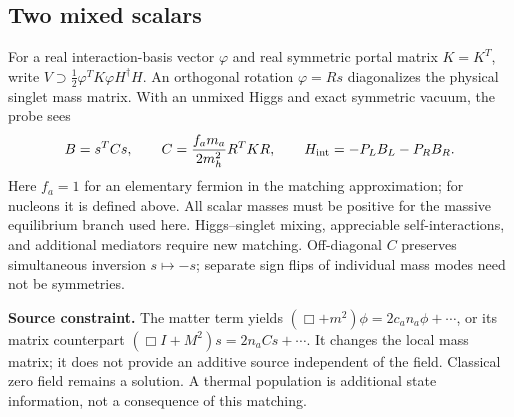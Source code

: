 \documentclass[11pt]{article}
\begin{document}
\subsection*{Two mixed scalars}
For a real interaction-basis vector $\varphi$ and real symmetric portal
matrix $K=K^T$, write $V\supset\tfrac12\varphi^TK\varphi H^\dagger H$.
An orthogonal rotation $\varphi=Rs$ diagonalizes the physical singlet
mass matrix. With an unmixed Higgs and exact symmetric vacuum, the probe sees
\begin{equation}
 B=s^TCs,\qquad C=\frac{f_am_a}{2m_h^2}R^TKR,
 \qquad H_{\rm int}=-P_LB_L-P_RB_R.
 \label{eq:matrix}
\end{equation}
Here $f_a=1$ for an elementary fermion in the matching approximation;
for nucleons it is defined above. All scalar masses must be positive for
the massive equilibrium branch used here. Higgs--singlet mixing, appreciable
self-interactions, and additional mediators require new matching.
Off-diagonal $C$ preserves simultaneous inversion $s\mapsto-s$;
separate sign flips of individual mass modes need not be symmetries.

\textbf{Source constraint.} The matter term yields
$(\Box+m^2)\phi=2c_an_a\phi+\cdots$, or its matrix counterpart
$(\Box I+M^2)s=2n_aCs+\cdots$. It changes the local mass matrix;
it does not provide an additive source independent of the field.
Classical zero field remains a solution. A thermal population is additional
state information, not a consequence of this matching.

\newpage
\end{document}
